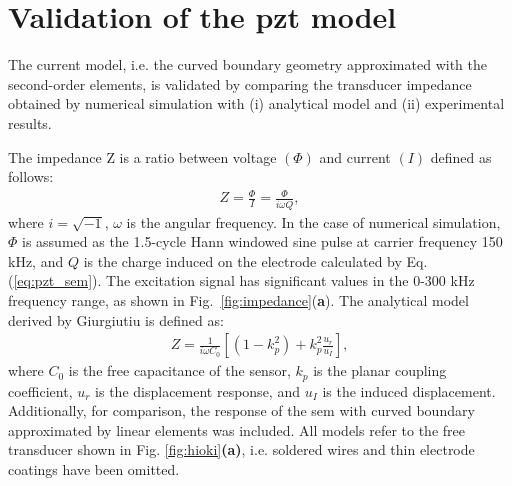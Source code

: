 \section{Validation of the \acs{pzt} model}
\label{sec:pztVal}

The current model, i.e. the curved boundary geometry approximated with the second-order elements, is validated by comparing the transducer impedance obtained by numerical simulation with (i) analytical model and (ii) experimental results.

The impedance Z is a ratio between voltage \((\Phi)\) and current \((I)\) defined as follows:
\begin{eqnarray}
	Z = \frac{\Phi}{I} = \frac{\Phi}{i\omega Q},
	\label{eq:impedance}
\end{eqnarray}
%
%
%
%
where \(i=\sqrt{-1}\), \(\omega\) is the angular frequency.
In the case of numerical simulation, \(\Phi\) is assumed as the 1.5-cycle Hann windowed sine pulse at carrier frequency 150 \unit{\kHz}, and \(Q\) is the charge induced on the electrode calculated by Eq. (\ref{eq:pzt_sem}).
The excitation signal has significant values in the 0-300 \unit{\kHz} frequency range, as shown in Fig.~\ref{fig:impedance}(\textbf{a}).
The analytical model derived by Giurgiutiu \cite{giurgiutiu2009micromechatronics} is defined as:
\begin{eqnarray}
	Z = \frac{1}{i\omega C_0}\left[\left(1-k_p^2\right)+k_p^2\frac{u_r}{u_I}\right],
\end{eqnarray}
%
%
where \(C_0\) is the free capacitance of the sensor, \(k_p\) is the planar coupling coefficient, \(u_r\) is the displacement response, and \(u_I\) is the induced displacement.
Additionally, for comparison, the response of the \ac{sem} with curved boundary approximated by linear elements was included.
All models refer to the free transducer shown in Fig. \ref{fig:hioki}\textbf{(a)}, i.e. soldered wires and thin electrode coatings have been omitted.

